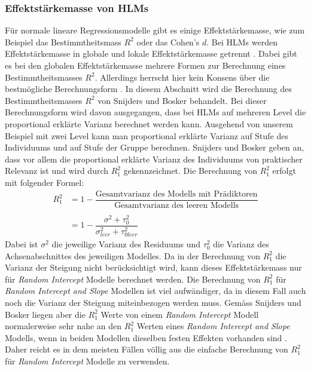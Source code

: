 \documentclass[12pt, a4paper]{article}\usepackage[]{graphicx}\usepackage[]{color}
\begin{document}
\subsubsection{Effektstärkemasse von HLMs}
Für normale lineare Regressionsmodelle gibt es einige Effektstärkemasse, wie zum Beispiel das Bestimmtheitsmass $R^2$ oder das Cohen's $d$. Bei HLMs werden Effektstärkemasse in globale und lokale Effektstärkemasse getrennt \citep{PEUGH201085}. Dabei gibt es bei den globalen Effektstärkemasse mehrere Formen zur Berechnung eines Bestimmtheitsmasses $R^2$. Allerdings herrscht hier kein Konsens über die bestmögliche Berechnungsform \citep{raudenbush2002hierarchical,SnijdersTomA.B2012Ma:a}. In diesem Abschnitt wird die Berechnung des Bestimmtheitsmasses $R^2$ von Snijders und Bosker \citeyearpar{SnijdersTomA.B2012Ma:a} behandelt. Bei dieser Berechnungsform wird davon ausgegangen, dass bei HLMs auf mehreren Level die proportional erklärte Varianz berechnet werden kann. Ausgehend von unserem Beispiel mit zwei Level kann man proportional erklärte Varianz auf Stufe des Individuums und auf Stufe der Gruppe berechnen. Snijders und Bosker \citeyearpar{SnijdersTomA.B2012Ma:a} geben an, dass vor allem die proportional erklärte Varianz des Individuums von praktischer Relevanz ist und wird durch $R_{1}^2$ gekennzeichnet. Die Berechnung von $R_{1}^2$ erfolgt mit folgender Formel:
\begin{equation} \label{eq:r_square}
\begin{split}	
 R_{1}^2 & = 1 - \dfrac{\text{Gesamtvarianz des Modells mit Prädiktoren}}{\text{Gesamtvarianz des leeren Modells}} \\
 & \\
 & = 1 - \dfrac{\sigma^2 + \tau_{0}^2}{\sigma_{leer}^2 + \tau_{0leer}^2}
\end{split}	
\end{equation}
Dabei ist $\sigma^2$ die jeweilige Varianz des Residuums und $\tau_{0}^2$ die Varianz des Achsenabschnittes des jeweiligen Modelles. Da in der Berechnung von $R_{1}^2$ die Varianz der Steigung nicht berücksichtigt wird, kann dieses Effektstärkemass nur für \textit{Random Intercept} Modelle berechnet werden. Die Berechnung von $R_{1}^2$ für \textit{Random Intercept and Slope} Modellen ist viel aufwändiger, da in diesem Fall auch noch die Varianz der Steigung miteinbezogen werden muss. Gemäss Snijders und Bosker liegen aber die $R_{1}^2$ Werte von einem \textit{Random Intercept} Modell normalerweise sehr nahe an den $R_{1}^2$ Werten eines \textit{Random Intercept and Slope} Modells, wenn in beiden Modellen dieselben festen Effekten vorhanden sind \citep{SnijdersTomA.B2012Ma:a}. Daher reicht es in dem meisten Fällen völlig aus die einfache Berechnung von $R_{1}^2$ für \textit{Random Intercept} Modelle zu verwenden.
\end{document}
